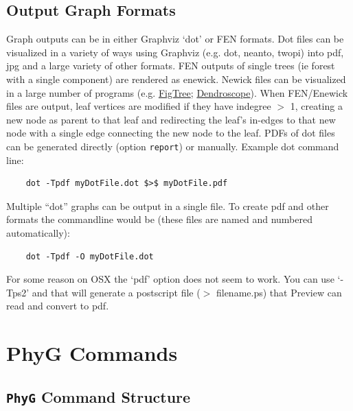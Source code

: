 \documentclass[11pt]{book}
\newcommand{\phyg}{\texttt{PhyG} }
\begin{document}
{{\section{Output Graph Formats}
	Graph outputs can be in either Graphviz `dot' or FEN formats. Dot files can be visualized 
	in a variety of ways using Graphviz (e.g. dot, neanto, twopi) into pdf, jpg and a large variety 
	of other formats. FEN outputs of single trees (ie forest with a single component) are rendered 
	as enewick. Newick files can be visualized in a 	large number of programs 
	(e.g. \href{http://tree.bio.ed.ac.uk/software/figtree/}{FigTree}; 
	\href{http:/https://uni-tuebingen.de/fakultaeten/mathematisch-naturwissenschaftliche-fakultaet/fachbereiche/informatik/lehrstuehle/algorithms-in-bioinformatics/software/}
	{Dendroscope}). 	
	When FEN/Enewick files are output, leaf vertices are modified if they have indegree $>$ 1, 
	creating a new node as parent to that leaf 	and redirecting the leaf's in-edges to that new 
	node with a single edge connecting the new node to the leaf. PDFs of dot files can be 
	generated directly (option \texttt{report}) or manually.  Example dot command line: 
	
	\begin{verbatim}
	dot -Tpdf myDotFile.dot $>$ myDotFile.pdf
	\end{verbatim}
		
	Multiple ``dot'' graphs can be output in a single file. To create pdf and other formats the
	commandline would be (these files are named and numbered automatically):
	
	\begin{verbatim}
	dot -Tpdf -O myDotFile.dot
	\end{verbatim}
		
	For some reason on OSX the `pdf' option does not seem to work. You can use `-Tps2' and 
	that will generate 
	a postscript file ($>$ filename.ps) that Preview can read and convert to pdf.

	
\chapter{PhyG Commands}

\section{\phyg Command Structure}
		
}}
\end{document}
